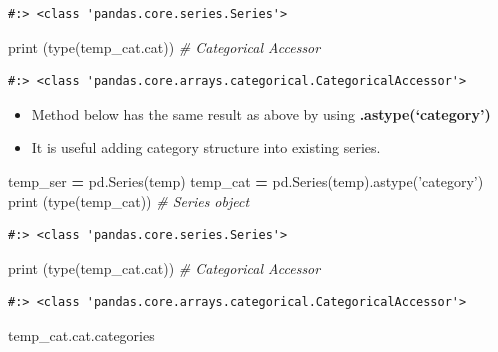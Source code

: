 \documentclass[
]{book}
\newenvironment{Shaded}{\begin{snugshade}}{\end{snugshade}}
\newcommand{\BuiltInTok}[1]{#1}
\newcommand{\CommentTok}[1]{\textcolor[rgb]{0.37,0.37,0.37}{\textit{#1}}}
\newcommand{\NormalTok}[1]{#1}
\newcommand{\OperatorTok}[1]{\textcolor[rgb]{0.43,0.43,0.43}{\textbf{#1}}}
\newcommand{\StringTok}[1]{\textcolor[rgb]{0.5,0.5,0.5}{#1}}
\providecommand{\tightlist}{%
  \setlength{\itemsep}{0pt}\setlength{\parskip}{0pt}}
\begin{document}
\begin{verbatim}
#:> <class 'pandas.core.series.Series'>
\end{verbatim}

\begin{Shaded}
\begin{Highlighting}[]
\BuiltInTok{print}\NormalTok{ (}\BuiltInTok{type}\NormalTok{(temp_cat.cat))   }\CommentTok{# Categorical Accessor}
\end{Highlighting}
\end{Shaded}

\begin{verbatim}
#:> <class 'pandas.core.arrays.categorical.CategoricalAccessor'>
\end{verbatim}

\begin{itemize}
\tightlist
\item
  Method below has the same result as above by using \textbf{.astype(`category')}\\
\item
  It is useful adding category structure into existing series.
\end{itemize}

\begin{Shaded}
\begin{Highlighting}[]
\NormalTok{temp_ser }\OperatorTok{=}\NormalTok{ pd.Series(temp)}
\NormalTok{temp_cat }\OperatorTok{=}\NormalTok{ pd.Series(temp).astype(}\StringTok{'category'}\NormalTok{)}
\BuiltInTok{print}\NormalTok{ (}\BuiltInTok{type}\NormalTok{(temp_cat))       }\CommentTok{# Series object}
\end{Highlighting}
\end{Shaded}

\begin{verbatim}
#:> <class 'pandas.core.series.Series'>
\end{verbatim}

\begin{Shaded}
\begin{Highlighting}[]
\BuiltInTok{print}\NormalTok{ (}\BuiltInTok{type}\NormalTok{(temp_cat.cat))   }\CommentTok{# Categorical Accessor}
\end{Highlighting}
\end{Shaded}

\begin{verbatim}
#:> <class 'pandas.core.arrays.categorical.CategoricalAccessor'>
\end{verbatim}

\begin{Shaded}
\begin{Highlighting}[]
\NormalTok{temp_cat.cat.categories}
\end{Highlighting}
\end{Shaded}
\end{document}
